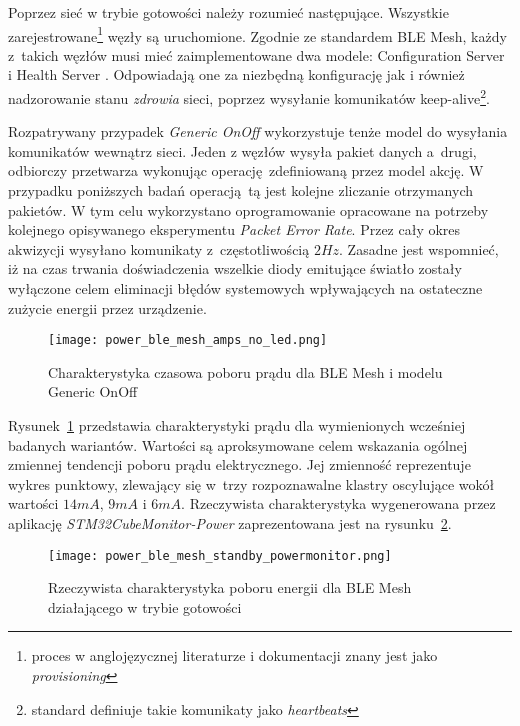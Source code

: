 Poprzez sieć w trybie gotowości należy rozumieć następujące. Wszystkie zarejestrowane\footnote{proces w anglojęzycznej literaturze i dokumentacji znany jest jako \textit{provisioning}} węzły są uruchomione. Zgodnie ze standardem BLE Mesh, każdy z~takich węzłów musi mieć zaimplementowane dwa modele:
Configuration Server i Health Server \cite{wooley_martin_bluetooth_2019}. Odpowiadają one za niezbędną konfigurację jak i również nadzorowanie stanu \textit{zdrowia} sieci, poprzez wysyłanie komunikatów keep-alive\footnote{standard definiuje takie komunikaty jako \textit{heartbeats}\cite{wooley_martin_bluetooth_2019}\cite{mesh_working_group_mesh_2019}}.

Rozpatrywany przypadek \textit{Generic OnOff} wykorzystuje tenże model do wysyłania komunikatów wewnątrz sieci. Jeden z węzłów wysyła pakiet danych a~drugi, odbiorczy przetwarza wykonując operację zdefiniowaną przez model akcję. W przypadku poniższych badań operacją tą jest kolejne zliczanie
otrzymanych pakietów. W tym celu wykorzystano oprogramowanie opracowane na potrzeby kolejnego opisywanego eksperymentu \textit{Packet Error Rate}.
Przez cały okres akwizycji wysyłano komunikaty z~częstotliwością $2Hz$. Zasadne jest wspomnieć, iż na czas trwania doświadczenia wszelkie 
diody emitujące światło zostały wyłączone celem eliminacji błędów systemowych wpływających na ostateczne zużycie energii przez
urządzenie.

\begin{figure}[!ht]
	\centering \texttt{[image: power\_ble\_mesh\_amps\_no\_led.png]} 
	\caption{Charakterystyka czasowa poboru prądu dla BLE Mesh i modelu Generic OnOff}
	\label{rys:power_ble_mesh_amps}
\end{figure}


Rysunek~\ref{rys:power_ble_mesh_amps} przedstawia charakterystyki prądu dla wymienionych wcześniej badanych wariantów. Wartości są aproksymowane
celem wskazania ogólnej zmiennej tendencji poboru prądu elektrycznego. Jej zmienność reprezentuje wykres punktowy, zlewający się 
w~trzy rozpoznawalne klastry oscylujące wokół wartości $14mA$, $9mA$ i $6mA$. Rzeczywista charakterystyka wygenerowana przez
aplikację \textit{STM32CubeMonitor-Power} zaprezentowana jest na rysunku~\ref{rys:power_ble_mesh_standby_powermonitor}.

\begin{figure}[!ht]
	\centering \texttt{[image: power\_ble\_mesh\_standby\_powermonitor.png]} 
	\caption{Rzeczywista charakterystyka poboru energii dla BLE Mesh działającego w trybie gotowości}
	\label{rys:power_ble_mesh_standby_powermonitor}
\end{figure}


